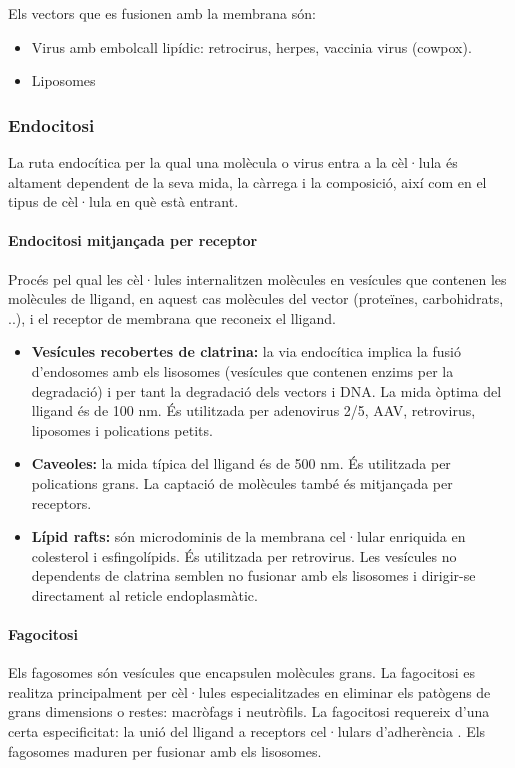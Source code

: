 Els vectors que es fusionen amb la membrana són:
\begin{itemize}
\item Virus amb embolcall lipídic: retrocirus, herpes, vaccinia virus (cowpox).
\item Liposomes
\end{itemize}

\subsubsection{Endocitosi}
\label{sec:endocitosi}
La ruta endocítica per la qual una molècula o virus entra a la cèl·lula és altament dependent de la seva mida, la càrrega i la composició, així com en el tipus de cèl·lula en què està entrant.

\paragraph{Endocitosi mitjançada per receptor}
Procés pel qual les cèl·lules internalitzen molècules en vesícules que contenen les molècules de lligand, en aquest cas molècules del vector (proteïnes, carbohidrats, ..), i el receptor de membrana que reconeix el lligand.

\begin{itemize}
\item \textbf{Vesícules recobertes de clatrina:} la via endocítica implica la fusió d'endosomes amb els lisosomes (vesícules que contenen enzims per la degradació) i per tant la degradació dels vectors i DNA. La mida òptima del lligand és de 100 nm. És utilitzada per adenovirus 2/5, AAV, retrovirus, liposomes i polications petits.

\item \textbf{Caveoles:} la mida típica del lligand és de 500 nm. És utilitzada per polications grans. La captació de molècules també és mitjançada per receptors.

\item \textbf{Lípid rafts:} són microdominis de la membrana cel·lular enriquida en colesterol i esfingolípids. És utilitzada per retrovirus. Les vesícules no dependents de clatrina semblen no fusionar amb els lisosomes i dirigir-se directament al reticle endoplasmàtic.
\end{itemize}

\paragraph{Fagocitosi}
Els fagosomes són vesícules que encapsulen molècules grans. La fagocitosi es realitza principalment per cèl·lules especialitzades en eliminar els patògens de grans dimensions o restes: macròfags i neutròfils. La fagocitosi requereix d'una certa especificitat: la unió del lligand a receptors cel·lulars d'adherència . Els fagosomes maduren per fusionar amb els lisosomes.

